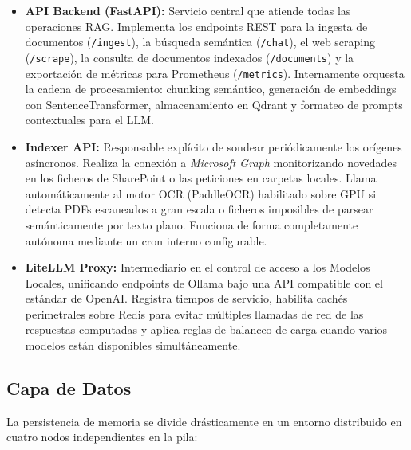 \begin{itemize}
    \item \textbf{API Backend (FastAPI):} Servicio central que atiende todas las operaciones RAG. Implementa los endpoints REST para la ingesta de documentos (\texttt{/ingest}), la búsqueda semántica (\texttt{/chat}), el web scraping (\texttt{/scrape}), la consulta de documentos indexados (\texttt{/documents}) y la exportación de métricas para Prometheus (\texttt{/metrics}). Internamente orquesta la cadena de procesamiento: chunking semántico, generación de embeddings con SentenceTransformer, almacenamiento en Qdrant y formateo de prompts contextuales para el LLM.

    \item \textbf{Indexer API:} Responsable explícito de sondear periódicamente los orígenes asíncronos. Realiza la conexión a \textit{Microsoft Graph} monitorizando novedades en los ficheros de SharePoint o las peticiones en carpetas locales. Llama automáticamente al motor OCR (PaddleOCR) habilitado sobre GPU si detecta PDFs escaneados a gran escala o ficheros imposibles de parsear semánticamente por texto plano. Funciona de forma completamente autónoma mediante un cron interno configurable.

    \item \textbf{LiteLLM Proxy:} Intermediario en el control de acceso a los Modelos Locales, unificando endpoints de Ollama bajo una API compatible con el estándar de OpenAI. Registra tiempos de servicio, habilita cachés perimetrales sobre Redis para evitar múltiples llamadas de red de las respuestas computadas y aplica reglas de balanceo de carga cuando varios modelos están disponibles simultáneamente.
\end{itemize}

\subsection{Capa de Datos}
La persistencia de memoria se divide drásticamente en un entorno distribuido en cuatro nodos independientes en la pila:

